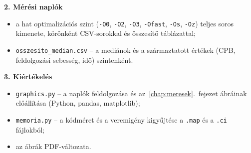 \documentclass[a4paper,12pt]{report}
\theoremstyle{definition}
\theoremstyle{remark}
\begin{document}
\noindent\textbf{2. Mérési naplók}
\begin{itemize}
	\item a hat optimalizációs szint (\texttt{-O0}, \texttt{-O2}, \texttt{-O3}, \texttt{-Ofast}, \texttt{-Os}, \texttt{-Oz}) teljes soros kimenete, körönként CSV-sorokkal és összesítő táblázattal;
	\item \texttt{osszesito\_median.csv} -- a mediánok és a származtatott értékek (CPB, feldolgozási sebesség, idő) szintenként.
\end{itemize}

\noindent\textbf{3. Kiértékelés}
\begin{itemize}
	\item \texttt{graphics.py} -- a naplók feldolgozása és az~\ref{chap:meresek}.~fejezet ábráinak előállítása (Python, pandas, matplotlib);
	\item \texttt{memoria.py} -- a kódméret és a veremigény kigyűjtése a \texttt{.map} és a \texttt{.ci} fájlokból;
	\item az ábrák PDF-változata.
\end{itemize}
\end{document}
